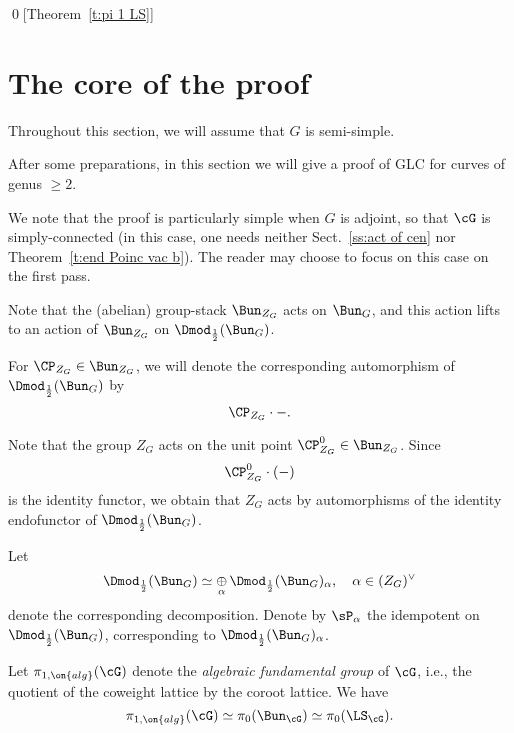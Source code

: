\documentclass[9pt]{amsart}
\theoremstyle{remark}
\theoremstyle{definition}
\theoremstyle{remark}
\newcommand{\thmref}[1]{Theorem~\ref{#1}}
\newcommand{\secref}[1]{Sect.~\ref{#1}}
\numberwithin{equation}{section}
\begin{document}
\qed[\thmref{t:pi 1 LS}]
  
\section{The core of the proof} \label{s:proof}

Throughout this section, we will assume that $G$ is semi-simple. 

\medskip

After some preparations, in this section we will give a proof of GLC for curves of genus $\geq 2$. 

\medskip

We note that the proof is particularly simple when $G$ is adjoint, so that $\cG$ is simply-connected
(in this case, one needs neither \secref{ss:act of cen} nor \thmref{t:end Poinc vac b}). The reader 
may choose to focus on this case on the first pass. 

 \label{ss:act of cen}

\sssec{}

Note that the (abelian) group-stack $\Bun_{Z_G}$ acts on $\Bun_G$, and this action lifts to
an action of $\Bun_{Z_G}$ on $\Dmod_{\frac{1}{2}}(\Bun_G)$. 

\medskip

For $\CP_{Z_G}\in \Bun_{Z_G}$, we will denote the corresponding automorphism of $\Dmod_{\frac{1}{2}}(\Bun_G)$ by 
\begin{equation} \label{e:central shift}
\CP_{Z_G}\cdot -.
\end{equation} 

\sssec{}

Note that the group $Z_G$ acts on the unit point $\CP^0_{Z_G}\in \Bun_{Z_G}$. Since 
$$\CP^0_{Z_G} \cdot (-)$$ 
is the identity functor, we obtain that $Z_G$ acts by automorphisms of the identity endofunctor
of $\Dmod_{\frac{1}{2}}(\Bun_G)$.

\medskip

Let
$$\Dmod_{\frac{1}{2}}(\Bun_G) \simeq \underset{\alpha}\oplus\, \Dmod_{\frac{1}{2}}(\Bun_G)_\alpha, \quad \alpha\in (Z_G)^\vee$$
denote the corresponding decomposition. Denote by $\sP_\alpha$ the idempotent on $\Dmod_{\frac{1}{2}}(\Bun_G)$, corresponding 
to $\Dmod_{\frac{1}{2}}(\Bun_G)_\alpha$.

\sssec{}

Let $\pi_{1,\on{alg}}(\cG)$ denote the \emph{algebraic fundamental group} of $\cG$, i.e., the quotient of the coweight lattice by the coroot lattice. 
We have
$$\pi_{1,\on{alg}}(\cG)\simeq \pi_0(\Bun_\cG)\simeq \pi_0(\LS_\cG).$$
\end{document}
